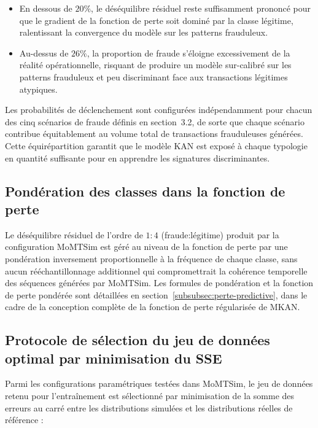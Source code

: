 \documentclass[11pt,a4paper,oneside]{report}
\theoremstyle{definition}
\theoremstyle{remark}
\begin{document}
\begin{itemize}
    \item En dessous de $20\%$, le déséquilibre résiduel reste suffisamment prononcé pour que le gradient de la fonction de perte soit dominé par la classe légitime, ralentissant la convergence du modèle sur les patterns frauduleux.

    \item Au-dessus de $26\%$, la proportion de fraude s'éloigne excessivement de la réalité opérationnelle, risquant de produire un modèle sur-calibré sur les patterns frauduleux et peu discriminant face aux transactions légitimes atypiques.
\end{itemize}

Les probabilités de déclenchement sont configurées indépendamment pour chacun des cinq scénarios de fraude définis en section~3.2, de sorte que chaque scénario contribue équitablement au volume total de transactions frauduleuses générées. Cette équirépartition garantit que le modèle KAN est exposé à chaque typologie en quantité suffisante pour en apprendre les signatures discriminantes.

\subsection{Pondération des classes dans la fonction de perte}

Le déséquilibre résiduel de l'ordre de $1:4$ (fraude:légitime) produit par la configuration MoMTSim est géré au niveau de la fonction de perte par une pondération inversement proportionnelle à la fréquence de chaque classe, sans aucun rééchantillonnage additionnel qui compromettrait la cohérence temporelle des séquences générées par MoMTSim. Les formules de pondération et la fonction de perte pondérée sont détaillées en section~\ref{subsubsec:perte-predictive}, dans le cadre de la conception complète de la fonction de perte régularisée de MKAN.

\subsection{Protocole de sélection du jeu de données optimal par minimisation du SSE}

Parmi les configurations paramétriques testées dans MoMTSim, le jeu de données retenu pour l'entraînement est sélectionné par minimisation de la somme des erreurs au carré entre les distributions simulées et les distributions réelles de référence :
\end{document}
